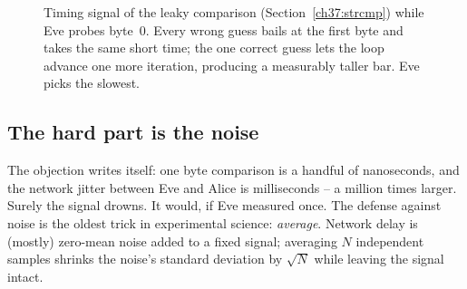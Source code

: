 \begin{figure}[H]
\centering
{}
\caption{Timing signal of the leaky comparison (Section~\ref{ch37:strcmp}) while Eve probes byte~0.
Every wrong guess bails at the first byte and takes the same short time; the one correct guess lets
the loop advance one more iteration, producing a measurably taller bar. Eve picks the slowest.}
\label{ch37:fig-timing}
\end{figure}

\subsection{The hard part is the noise}
\label{ch37:noise}

The objection writes itself: one byte comparison is a handful of nanoseconds, and the network jitter between Eve and Alice is milliseconds -- a million times larger. Surely the signal drowns. It would, if Eve measured once. The defense against noise is the oldest trick in experimental science: \emph{average}. Network delay is (mostly) zero-mean noise added to a fixed signal; averaging $N$ independent samples shrinks the noise's standard deviation by $\sqrt{N}$ while leaving the signal intact.


